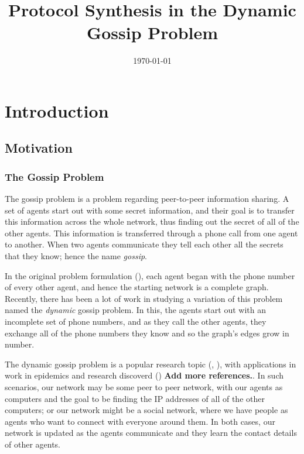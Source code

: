 \documentclass[12pt, a4paper]{article}
\title{Protocol Synthesis in the Dynamic Gossip Problem} %
\author{
	\authorstyle{Leo Poulson}
	\newline\newline %
}
\date{\today}
\begin{document}
\maketitle
\thispagestyle{firstpage}

\section{Introduction}

\subsection{Motivation}

\subsubsection{The Gossip Problem} 
The gossip problem is a problem regarding peer-to-peer information sharing. A
set of agents start out with some secret information, and their goal is to
transfer this information across the whole network, thus finding out the secret
of all of the other agents. This information is transferred through a phone call
from one agent to another. When two agents communicate they tell each other all
the secrets that they know; hence the name \textit{gossip}. %

In the original problem formulation (\cite{Tijdeman:1971}), each agent began
with the phone number of every other agent, and hence the starting network is a
complete graph. Recently, there has been a lot of work in studying a variation
of this problem named the \textit{dynamic} gossip problem. In this, the agents
start out with an incomplete set of phone numbers, and as they call the other
agents, they exchange all of the phone numbers they know and so the graph's
edges grow in number.

The dynamic gossip problem is a popular research topic (\cite{DynamicGossip},
\cite{EpProforDyGo}), with applications in work in epidemics and research
discoverd (\cite{DiscoverythruGossip}) \textbf{Add more references.}. In such
scenarios, our network may be some peer to peer network, with our agents as
computers and the goal to be finding the IP addresses of all of the other
computers; or our network might be a social network, where we have people as
agents who want to connect with everyone around them. In both cases, our network
is updated as the agents communicate and they learn the contact details of other
agents.
\end{document}
